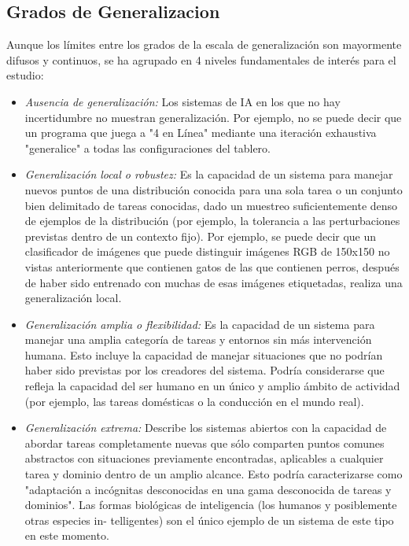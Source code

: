 \subsection*{Grados de Generalizacion}

Aunque los límites entre los grados de la escala de generalización son mayormente difusos y continuos, se ha agrupado en 4 niveles fundamentales de interés para el estudio:

\begin{itemize}
\item \textit{Ausencia de generalización:} Los sistemas de IA en los que no hay incertidumbre no muestran generalización. Por ejemplo, no se puede decir que un programa que juega a "4 en Línea" mediante una iteración exhaustiva "generalice" a todas las configuraciones del tablero.

\item \textit{Generalización local o robustez:} Es la capacidad de un sistema para manejar nuevos puntos de una distribución conocida para una sola tarea o un conjunto bien delimitado de tareas conocidas, dado un muestreo suficientemente denso de ejemplos de la distribución (por ejemplo, la tolerancia a las perturbaciones previstas dentro de un contexto fijo). Por ejemplo, se puede decir que un clasificador de imágenes que puede distinguir imágenes RGB de 150x150 no vistas anteriormente que contienen gatos de las que contienen perros, después de haber sido entrenado con muchas de esas imágenes etiquetadas, realiza una generalización local. 

\item \textit{Generalización amplia o flexibilidad:} Es la capacidad de un sistema para manejar una amplia categoría de tareas y entornos sin más intervención humana. Esto incluye la capacidad de manejar situaciones que no podrían haber sido previstas por los creadores del sistema. Podría considerarse que refleja la capacidad del ser humano en un único y amplio ámbito de actividad (por ejemplo, las tareas domésticas o la conducción en el mundo real).

\item \textit{Generalización extrema:} Describe los sistemas abiertos con la capacidad de abordar tareas completamente nuevas que sólo comparten puntos comunes abstractos con situaciones previamente encontradas, aplicables a cualquier tarea y dominio dentro de un amplio alcance. Esto podría caracterizarse como "adaptación a incógnitas desconocidas en una gama desconocida de tareas y dominios". Las formas biológicas de inteligencia (los humanos y posiblemente otras especies in- telligentes) son el único ejemplo de un sistema de este tipo en este momento.
\end{itemize}

